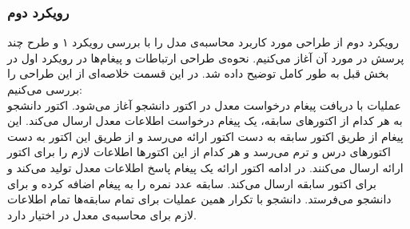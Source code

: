 \subsubsection{رویکرد دوم}
\label{gpa_approch2}
رویکرد دوم از طراحی مورد کاربرد محاسبه‌ی مدل را با بررسی رویکرد ۱ و طرح چند پرسش در مورد آن آغاز می‌کنیم. نحوه‌ی طراحی ارتباطات و پیغام‌ها در رویکرد اول در بخش قبل به طور کامل توضیح داده شد. در این قسمت خلاصه‌ای از این طراحی را بررسی می‌کنیم:\\
عملیات با دریافت پیغام درخواست معدل  در اکتور دانشجو آغاز می‌شود. اکتور دانشجو به هر کدام از اکتورهای سابقه، یک پیغام درخواست اطلاعات معدل  ارسال می‌کند. این پیغام از طریق اکتور سابقه به دست اکتور ارائه می‌رسد و از طریق این اکتور به دست اکتورهای درس و ترم می‌رسد و هر کدام از این اکتورها اطلاعات لازم را برای اکتور ارائه ارسال می‌کنند. در ادامه اکتور ارائه یک پیغام پاسخ اطلاعات معدل   تولید می‌کند و برای اکتور سابقه ارسال می‌کند. سابقه عدد نمره را به پیغام اضافه کرده و برای دانشجو می‌فرستد. دانشجو با تکرار همین عملیات برای تمام سابقه‌ها تمام اطلاعات لازم برای محاسبه‌ی معدل در اختیار دارد.\\
